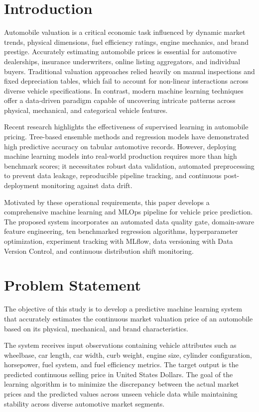 \documentclass[conference]{IEEEtran}
\begin{document}
\section{Introduction}
Automobile valuation is a critical economic task influenced by dynamic market trends, physical dimensions, fuel efficiency ratings, engine mechanics, and brand prestige. Accurately estimating automobile prices is essential for automotive dealerships, insurance underwriters, online listing aggregators, and individual buyers. Traditional valuation approaches relied heavily on manual inspections and fixed depreciation tables, which fail to account for non-linear interactions across diverse vehicle specifications. In contrast, modern machine learning techniques offer a data-driven paradigm capable of uncovering intricate patterns across physical, mechanical, and categorical vehicle features.

Recent research highlights the effectiveness of supervised learning in automobile pricing. Tree-based ensemble methods and regression models have demonstrated high predictive accuracy on tabular automotive records. However, deploying machine learning models into real-world production requires more than high benchmark scores; it necessitates robust data validation, automated preprocessing to prevent data leakage, reproducible pipeline tracking, and continuous post-deployment monitoring against data drift.

Motivated by these operational requirements, this paper develops a comprehensive machine learning and MLOps pipeline for vehicle price prediction. The proposed system incorporates an automated data quality gate, domain-aware feature engineering, ten benchmarked regression algorithms, hyperparameter optimization, experiment tracking with MLflow, data versioning with Data Version Control, and continuous distribution shift monitoring.

\section{Problem Statement}
The objective of this study is to develop a predictive machine learning system that accurately estimates the continuous market valuation price of an automobile based on its physical, mechanical, and brand characteristics.

The system receives input observations containing vehicle attributes such as wheelbase, car length, car width, curb weight, engine size, cylinder configuration, horsepower, fuel system, and fuel efficiency metrics. The target output is the predicted continuous selling price in United States Dollars. The goal of the learning algorithm is to minimize the discrepancy between the actual market prices and the predicted values across unseen vehicle data while maintaining stability across diverse automotive market segments.
\end{document}
